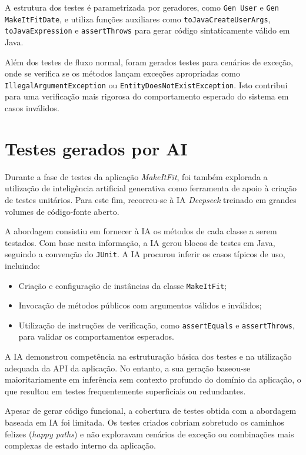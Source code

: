 \documentclass[12pt, a4paper]{article}
\begin{document}
A estrutura dos testes é parametrizada por geradores, como \texttt{Gen User} e
\texttt{Gen MakeItFitDate}, e utiliza funções auxiliares como \texttt{toJavaCreateUserArgs},
\texttt{toJavaExpression} e \texttt{assertThrows} para gerar código sintaticamente válido em Java.

Além dos testes de fluxo normal, foram gerados testes para cenários de exceção, onde se verifica se
os métodos lançam exceções apropriadas como \texttt{IllegalArgumentException} ou
\texttt{EntityDoesNotExistException}. Isto contribui para uma verificação mais rigorosa do
comportamento esperado do sistema em casos inválidos.

\section{Testes gerados por AI}

Durante a fase de testes da aplicação \textit{MakeItFit}, foi também explorada a utilização de
inteligência artificial generativa como ferramenta de apoio à criação de testes unitários. Para este
fim, recorreu-se à IA \textit{Deepseek} treinado em grandes volumes de código-fonte aberto.

A abordagem consistiu em fornecer à IA os métodos de cada classe a serem testados. Com base nesta
informação, a IA gerou blocos de testes em Java, seguindo a convenção do \texttt{JUnit}. A IA
procurou inferir os casos típicos de uso, incluindo:

\begin{itemize}
  \item Criação e configuração de instâncias da classe \texttt{MakeItFit};
  \item Invocação de métodos públicos com argumentos válidos e inválidos;
  \item Utilização de instruções de verificação, como \texttt{assertEquals} e \texttt{assertThrows},
  para validar os comportamentos esperados.
\end{itemize}

A IA demonstrou competência na estruturação básica dos testes e na utilização adequada da API da
aplicação. No entanto, a sua geração baseou-se maioritariamente em inferência sem contexto profundo
do domínio da aplicação, o que resultou em testes frequentemente superficiais ou redundantes.

Apesar de gerar código funcional, a cobertura de testes obtida com a abordagem baseada em IA foi
limitada. Os testes criados cobriam sobretudo os caminhos felizes (\textit{happy paths}) e não
exploravam cenários de exceção ou combinações mais complexas de estado interno da aplicação.
\end{document}
